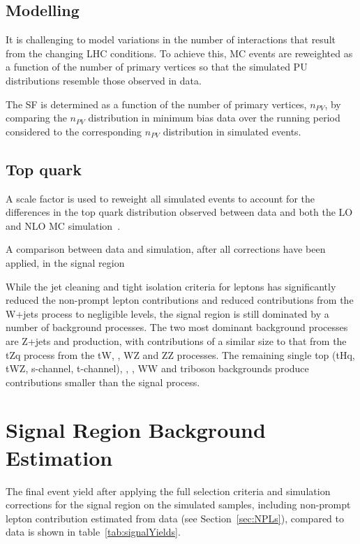 \subsection{\PU Modelling}\label{subsec:puSF}
It is challenging to model variations in the number of \PU interactions that result from the changing LHC conditions.
To achieve this, MC events are reweighted as a function of the number of primary vertices so that the simulated PU distributions resemble those observed in data.

The \PU SF is determined as a function of the number of primary vertices, $n_{PV}$, by comparing the $n_{PV}$ distribution in minimum bias data over the running period considered to the corresponding $n_{PV}$ distribution in simulated events.

\subsection{Top quark \pt}
A scale factor is used to reweight all simulated \ttbar events to account for the differences in the top quark \pt distribution observed between data and both the LO and NLO MC simulation~\cite{Khachatryan:2015oqa}.

A comparison between data and simulation, after all corrections have been applied, in the signal region 

While the jet cleaning and tight isolation criteria for leptons has significantly reduced the non-prompt lepton contributions and reduced contributions from the W+jets process to negligible levels, the signal region is still dominated by a number of background processes.
The two most dominant background processes are Z+jets and \ttbar production, with contributions of a similar size to that from the tZq process from the tW, \ttbarZ, WZ and ZZ processes.
The remaining single top (tHq, tWZ, s-channel, t-channel), \ttbarW, \ttbarH, WW and triboson backgrounds produce contributions smaller than the signal process.

\section{Signal Region Background Estimation}\label{sec:simBackgrounds}
The final event yield after applying the full selection criteria and simulation corrections for the signal region on the simulated samples, including non-prompt lepton contribution estimated from data (see Section~\ref{sec:NPLs}), compared to data is shown in table~\ref{tab:signalYields}.

